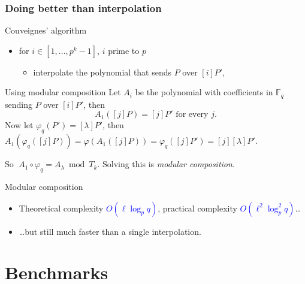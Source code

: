 \documentclass[10pt]{beamer}
\newcommand{\blue}[1]{\textcolor{blue}{#1}}  %
\newcommand{\F}{\mathbb{F}}  %
\newcommand{\frob}{\varphi}  %
\newcommand{\0}{\mathcal{O}}  %
\begin{document}

\begin{frame}
  \frametitle{Doing better than interpolation}

  \begin{block}{Couveignes' algorithm}
    \begin{itemize}
    \item for $i \in [1,\dots,p^k-1]$, $i$ prime to $p$
      \begin{itemize}
      \item interpolate the polynomial that sends $P$ over $[i]P'$,
      \end{itemize}
    \end{itemize}
  \end{block}

  \begin{block}{Using modular composition}
    Let $A_i$ be the polynomial with coefficients in $\F_q$ sending
    $P$ over $[i]P'$, then
    \[A_1([j]P) = [j]P' \text{ for every $j$.}\]
    Now let $\frob_q(P') = [\lambda]P'$, then $A_1(\frob_q([j]P)) =
    \frob(A_1([j]P)) = \frob_q([j]P') = [j][\lambda]P'$.

    So \alert{$\;A_1\circ\frob_q = A_\lambda \bmod T_k$}. Solving this
    is \emph{modular composition}.
  \end{block}

  \begin{block}{Modular composition}
    \begin{itemize}
    \item Theoretical complexity \blue{$O(\ell\log_pq)$}, practical
      complexity \blue{$O(\ell^2\log_p^2q)$}\dots
    \item \dots but still much faster than a single interpolation.
    \end{itemize}
  \end{block}
\end{frame}


\section{Benchmarks}
\end{document}
